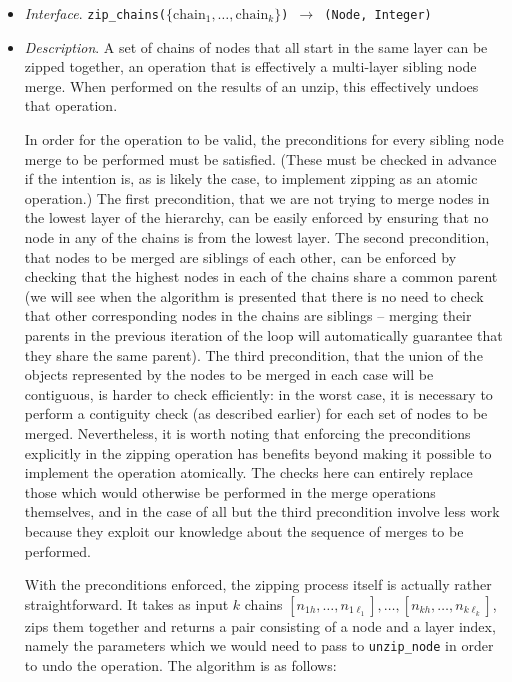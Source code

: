 \begin{itemize}

\item \emph{Interface}. \texttt{zip_chains($\{\mbox{chain}_1,\ldots,\mbox{chain}_k\}$) $\rightarrow$ (Node, Integer)}

\item \emph{Description}. A set of chains of nodes that all start in the same layer can be zipped together, an operation that is effectively a multi-layer sibling node merge. When performed on the results of an unzip, this effectively undoes that operation.

In order for the operation to be valid, the preconditions for every sibling node merge to be performed must be satisfied. (These must be checked in advance if the intention is, as is likely the case, to implement zipping as an atomic operation.) The first precondition, that we are not trying to merge nodes in the lowest layer of the hierarchy, can be easily enforced by ensuring that no node in any of the chains is from the lowest layer. The second precondition, that nodes to be merged are siblings of each other, can be enforced by checking that the highest nodes in each of the chains share a common parent (we will see when the algorithm is presented that there is no need to check that other corresponding nodes in the chains are siblings -- merging their parents in the previous iteration of the loop will automatically guarantee that they share the same parent). The third precondition, that the union of the objects represented by the nodes to be merged in each case will be contiguous, is harder to check efficiently: in the worst case, it is necessary to perform a contiguity check (as described earlier) for each set of nodes to be merged. Nevertheless, it is worth noting that enforcing the preconditions explicitly in the zipping operation has benefits beyond making it possible to implement the operation atomically. The checks here can entirely replace those which would otherwise be performed in the merge operations themselves, and in the case of all but the third precondition involve less work because they exploit our knowledge about the sequence of merges to be performed.

With the preconditions enforced, the zipping process itself is actually rather straightforward. It takes as input $k$ chains $[n_{1h},\ldots,n_{1\ell_1}], \ldots, [n_{kh},\ldots,n_{k\ell_k}]$, zips them together and returns a pair consisting of a node and a layer index, namely the parameters which we would need to pass to \texttt{unzip_node} in order to undo the operation. The algorithm is as follows:


\end{itemize}

